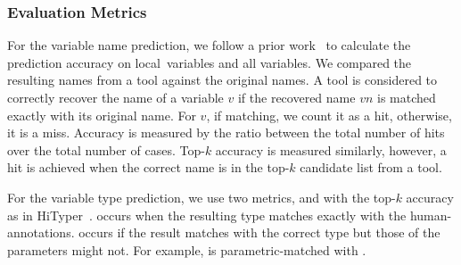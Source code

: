 
\subsubsection*{Evaluation Metrics}

For the variable name prediction, we follow a prior work~\cite{icse19}
to calculate the prediction accuracy on local~variables and all
variables. We compared the resulting names from a tool against the
original names. A tool is considered to correctly
recover the name of a variable $v$ if the recovered name $vn$ is
matched exactly with its original name. For $v$, if matching, we count
it as a hit, otherwise, it is a miss. Accuracy is measured by the
ratio between the total number of hits over the total number of
cases. Top-$k$ accuracy is measured similarly, however, a hit is
achieved when the correct name is in the top-$k$ candidate list from a
tool.

For the variable type prediction, we use two metrics,
 and  with the top-$k$
accuracy as in HiTyper~\cite{HiTyper-icse22}. 
occurs when the resulting type matches exactly with the
human-annotations.  occurs if the result
matches with the correct type but those of the parameters might
not. For example,  is 
parametric-matched with .


